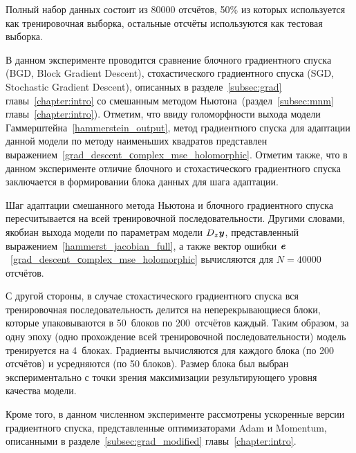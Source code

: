 Полный набор данных состоит из $80000$ отсчётов, 50\% из которых используется как тренировочная выборка, остальные отсчёты используются как тестовая выборка.

В данном эксперименте проводится сравнение блочного градиентного спуска (BGD, Block Gradient Descent), стохастического градиентного спуска (SGD, Stochastic Gradient Descent), описанных в разделе~\ref{subsec:grad} главы~\ref{chapter:intro} со смешанным методом Ньютона~(раздел~\ref{subsec:mnm} главы~\ref{chapter:intro}). Отметим, что ввиду голоморфности выхода модели Гаммерштейна~\eqref{hammerstein_output}, метод градиентного спуска для адаптации данной модели по методу наименьших квадратов представлен выражением~\eqref{grad_descent_сomplex_mse_holomorphic}. Отметим также, что в данном эксперименте отличие блочного и стохастического градиентного спуска заключается в формировании блока данных для шага адаптации. 

Шаг адаптации смешанного метода Ньютона и блочного градиентного спуска пересчитывается на всей тренировочной последовательности. Другими словами, якобиан выхода модели по параметрам модели $D_{\textbf{\textit{z}}}\textbf{\textit{y}}$, представленный выражением~\eqref{hammerst_jacobian_full}, а также вектор ошибки $\textbf{\textit{e}}$~\eqref{grad_descent_сomplex_mse_holomorphic} вычисляются для $N=40000$ отсчётов.

С другой стороны, в случае стохастического градиентного спуска вся тренировочная последовательность делится на неперекрывающиеся блоки, которые упаковываются в 50~блоков по 200~отсчётов каждый. Таким образом, за одну эпоху (одно прохождение всей тренировочной последовательности) модель тренируется на 4~блоках. Градиенты вычисляются для каждого блока (по 200 отсчётов) и усредняются (по 50 блоков). Размер блока был выбран экспериментально с точки зрения максимизации результирующего уровня качества модели.


Кроме того, в данном численном эксперименте рассмотрены ускоренные версии градиентного спуска, представленные оптимизаторами Adam и Momentum, описанными в разделе~\ref{subsec:grad_modified} главы~\ref{chapter:intro}.

